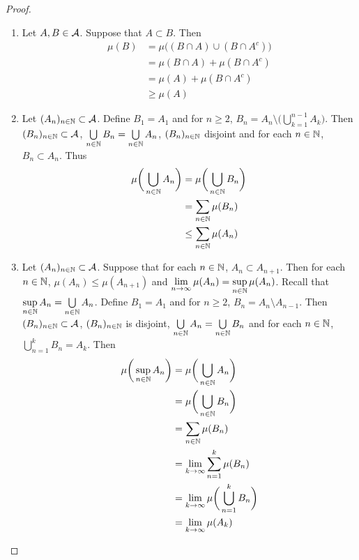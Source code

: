 \documentclass{book}
\begin{document}
	\begin{proof}\
		\begin{enumerate}
			\item Let $A, B \in \mathcal{A}$. Suppose that $A \subset B$. Then 
			\begin{align*}
				\mu(B) 
				&= \mu\bigg((B \cap A) \cup (B \cap A^c)\bigg)\\
				&= \mu(B \cap A) + \mu(B \cap A^c)\\
				&= \mu(A) + \mu(B \cap A^c)\\
				&\geq \mu(A)
			\end{align*}
			\item Let $(A_n)_{n \in \mathbb{N}} \subset \mathcal{A}$. Define $B_1 = A_1$ and for $n \geq 2$, $B_n = A_n \setminus \bigg( \bigcup\limits_{k=1}^{n-1}A_k \bigg)$. Then $(B_n)_{n \in \mathbb{N}} \subset \mathcal{A}$, $\bigcup\limits_{n \in \mathbb{N}}B_n = \bigcup\limits_{n \in \mathbb{N}}A_n $, $(B_n)_{n \in \mathbb{N}}$ disjoint and for each $n \in \mathbb{N}$, $B_n \subset A_n$. Thus 
			\begin{align*}
				\mu\bigg(\bigcup_{n \in \mathbb{N}}A_n \bigg)
				&= \mu\bigg(\bigcup_{n \in \mathbb{N}}B_n \bigg)\\
				&= \sum_{n \in \mathbb{N}}\mu(B_n) \\
				&\leq \sum_{n \in \mathbb{N}}\mu(A_n)
			\end{align*} 
			\item Let $(A_n)_{n \in \mathbb{N}} \subset \mathcal{A}$. Suppose that for each $n \in \mathbb{N}$, $A_n \subset A_{n+1}$. Then for each $n \in \mathbb{N}$, $\mu(A_n) \leq \mu(A_{n+1})$ and $\lim\limits_{n \rightarrow \infty}\mu(A_n) = \sup\limits_{n \in \mathbb{N}} \mu(A_n)$. Recall that $\sup\limits_{n \in \mathbb{N}}A_n = \bigcup\limits_{n \in \mathbb{N}}A_n$. 
			Define $B_1 = A_1$ and for $n \geq 2$, $B_n = A_n \setminus A_{n-1}$. Then $(B_n)_{n \in \mathbb{N}} \subset \mathcal{A}$, $(B_n)_{n \in \mathbb{N}}$ is disjoint, $\bigcup\limits_{n \in \mathbb{N}}A_n = \bigcup\limits_{n \in \mathbb{N}}B_n$ and for each $n \in \mathbb{N}$, $\bigcup\limits_{n=1}^{k}B_n = A_k$. Then 
			\begin{align*}
				\mu\bigg(\sup_{n \in \N}A_n \bigg)
				&= \mu\bigg(\bigcup_{n \in \N}A_n \bigg) \\
				&= \mu\bigg(\bigcup\limits_{n \in \N}B_n \bigg)\\
				&= \sum_{n \in \N} \mu(B_n) \\
				&= \lim_{k \rightarrow \infty} \sum_{n=1}^k \mu(B_n) \\
				&= \lim_{k \rightarrow \infty} \mu \bigg(\bigcup_{n=1}^k B_n \bigg) \\
				&= \lim_{k \rightarrow \infty} \mu(A_k) \\

\end{align*}
\end{enumerate}
\end{proof}
\end{document}
